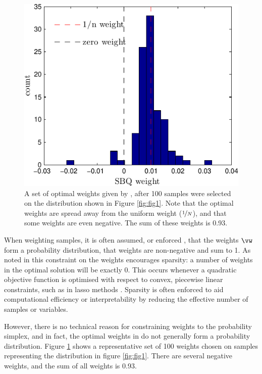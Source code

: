 \begin{figure}[h]
	\centering
	\includegraphics[width=.8\columnwidth]{figs/herding/weights_v1_n100}
	\caption[Empirical distribution of weights in sequential Bayesian quadrature]{A set of optimal weights given by \bq{}, after 100 \sbq{} samples were selected on the distribution shown in Figure \ref{fig:fig1}. Note that the optimal weights are spread away from the uniform weight ($\nicefrac{1}{N}$), and that some weights are even negative. The sum of these weights is 0.93.}
	\label{fig:weights100}
\end{figure}

\cbstart
When weighting samples, it is often assumed, or enforced \citep[as in][]{Bach2012,Song2008,Girolami03}, that the weights $\vw$ form a probability distribution, \ie that weights are non-negative and sum to 1. As noted in \eg \citep{Girolami03} this constraint on the weights encourages sparsity: a number of weights in the optimal solution will be exactly 0. This occurs whenever a quadratic objective function is optimised with respect to convex, piecewise linear constraints, such as in lasso methods \citep{Tibshirani96}. Sparsity is often enforced to aid computational efficiency or interpretability by reducing the effective number of samples or variables.
\cbend

However, there is no technical reason for constraining weights to the probability simplex, and in fact, the optimal weights in \bq{} do not generally form a probability distribution. Figure \ref{fig:weights100} shows a representative set of 100 \bq{} weights chosen on samples representing the distribution in figure \ref{fig:fig1}. There are several negative weights, and the sum of all weights is 0.93.

